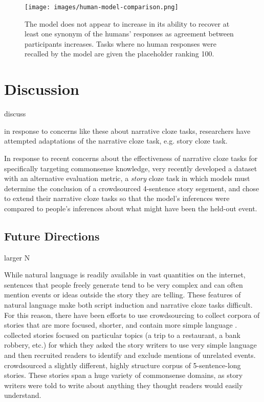 \documentclass[10pt,a4paper]{article}
\newcommand{\todo}[1]{{\color{red}#1}}
\begin{document}
\begin{figure}
 \centering
 \texttt{[image: images/human-model-comparison.png]}
 \caption{The model does not appear to increase in its ability to recover at least one synonym of the humans' responses as agreement between participants increases. Tasks where no human responses were recalled by the model are given the placeholder ranking 100.}
 \label{fig:human-model-comparison}
\end{figure}

\section{Discussion}

\todo{discuss}

\todo{in response to concerns like these about narrative cloze tasks, researchers have attempted adaptations of the narrative cloze task, e.g. story cloze task.}

In response to recent concerns about the effectiveness of narrative cloze tasks for specifically targeting commonsense knowledge,  very recently developed a dataset with an alternative evaluation metric, a {\em story} cloze task in which models must determine the conclusion of a crowdsourced 4-sentence story segement, and  chose to extend their narrative cloze tasks so that the model's inferences were compared to people's inferences about what might have been the held-out event.

\subsection{Future Directions}

\todo{larger N}

While natural language is readily available in vast quantities on the internet, sentences that people freely generate tend to be very complex and can often mention events or ideas outside the story they are telling. These features of natural language make both script induction and narrative cloze tasks difficult. For this reason, there have been efforts to use crowdsourcing to collect corpora of stories that are more focused, shorter, and contain more simple language \cite{li2013story, mostafazadeh2016corpus}.  collected stories focused on particular topics (a trip to a restaurant, a bank robbery, etc.) for which they asked the story writers to use very simple language and then recruited readers to identify and exclude mentions of unrelated events.  crowdsourced a slightly different, highly structure corpus of 5-sentence-long stories. These stories span a huge variety of commonsense domains, as story writers were told to write about anything they thought readers would easily understand.
\end{document}
